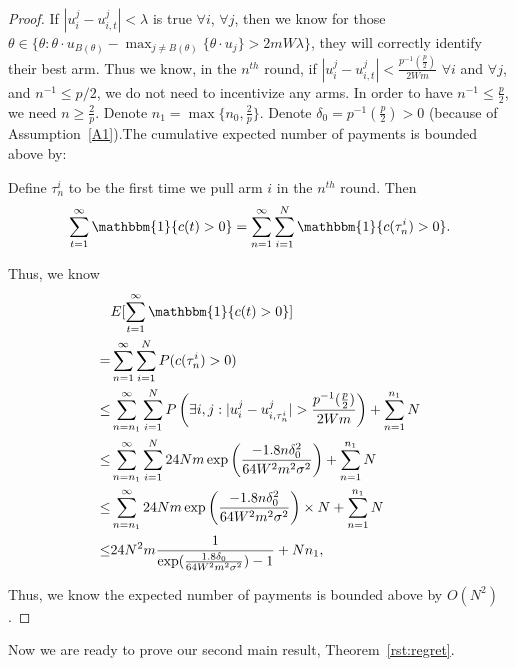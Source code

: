 \documentclass{article}
\begin{document}
\begin{proof}
If $|u_{i}^{j}-u_{i,t}^{j}|< \lambda$ is true $\forall i$, $\forall j$, then we know for those $\theta\in \{\theta:\theta\cdot u_{B(\theta)}-\max_{j\neq B(\theta)}\{\theta \cdot u_{j}\}> 2mW\lambda\}$, they will correctly identify their best arm. Thus we know, in the $n^{th}$ round, if $|u_{i}^{j}-u_{i,t}^{j}|< \frac{p^{-1}(\frac{p}{2})}{2Wm}$ $\forall i$ and $\forall j$, and $n^{-1}\leq p/2$, we do not need to incentivize any arms. In order to have $n^{-1}\leq \frac{p}{2}$, we need $n\geq \frac{2}{p}$. Denote $n_1=\max\{n_{0}, \frac{2}{p}\}$. Denote $\delta_{0}=p^{-1}(\frac{p}{2})>0$ (because of Assumption~\ref{A1}).The cumulative expected number of payments is bounded above by:

Define $\tau_{n}^{i}$ to be the first time we pull arm $i$ in the $n^{th}$ round. Then
\begin{align}
\sum_{t=1}^{\infty}\mathbbm{1}\{c(t)>0\} =\sum_{n=1}^{\infty}\sum_{i=1}^{N}\mathbbm{1}\{c(\tau_{n}^{i})>0\}. \nonumber
\end{align}

Thus, we know
\begin{align}
&E[\sum_{t=1}^{\infty}\mathbbm{1}\{c(t)>0\}] \nonumber \\
=&\sum_{n=1}^{\infty}\sum_{i=1}^{N}P(c(\tau_{n}^{i})>0) \nonumber \\
\leq &\sum_{n=n_{1}}^{\infty}\sum_{i=1}^{N}P\left(\exists i,j:|u_{i}^{j}-u_{i,\tau_{n}^{i}}^{j}|>\frac{p^{-1}(\frac{p}{2})}{2Wm}\right)+\sum_{n=1}^{n_1}N \nonumber \\
\leq &\sum_{n=n_{1}}^{\infty}\sum_{i=1}^{N}24Nm \exp\left(\frac{-1.8 n\delta_{0}^2}{64W^2 m^2\sigma^2}\right) +\sum_{n=1}^{n_1}N \nonumber \\
\leq & \sum_{n=n_{1}}^{\infty}24Nm \exp\left(\frac{-1.8 n\delta_{0}^2}{64W^2 m^2\sigma^2}\right)\times N+\sum_{n=1}^{n_1}N \nonumber  \\
\leq&24N^2 m \frac{1}{\exp(\frac{1.8\delta_{0}}{64W^2 m^2\sigma^2})-1} + Nn_1, \nonumber
\end{align}

Thus, we know the expected number of payments is bounded above by $O(N^2)$.

\end{proof}


Now we are ready to prove our second main result, Theorem~\ref{rst:regret}.
\end{document}
